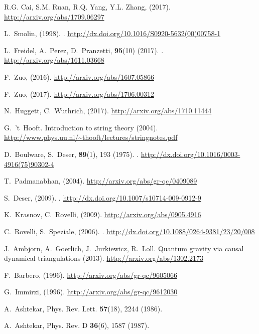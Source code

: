 \documentclass{ws-mpla}
\begin{document}
\begin{thebibliography}{0}
R.G. Cai, S.M. Ruan, R.Q. Yang, Y.L. Zhang,   (2017).
\newblock \urlprefix\url{http://arxiv.org/abs/1709.06297}

L.~Smolin,   (1998).
\newblock {}.
\newblock \urlprefix\url{http://dx.doi.org/10.1016/S0920-5632(00)00758-1}

L.~Freidel, A.~Perez, D.~Pranzetti,  \textbf{95}(10) (2017).
\newblock {}.
\newblock \urlprefix\url{http://arxiv.org/abs/1611.03668}

F.~Zuo,   (2016).
\newblock \urlprefix\url{http://arxiv.org/abs/1607.05866}

F.~Zuo,   (2017).
\newblock \urlprefix\url{http://arxiv.org/abs/1706.00312}

N.~Huggett, C.~Wuthrich,   (2017).
\newblock \urlprefix\url{http://arxiv.org/abs/1710.11444}

G.~'t~Hooft.
\newblock Introduction to string theory (2004).
\newblock
  \urlprefix\url{http://www.phys.uu.nl/~thooft/lectures/stringnotes.pdf}

D.~Boulware, S.~Deser,  \textbf{89}(1), 193 (1975).
\newblock {}.
\newblock \urlprefix\url{http://dx.doi.org/10.1016/0003-4916(75)90302-4}

T.~Padmanabhan,   (2004).
\newblock \urlprefix\url{http://arxiv.org/abs/gr-qc/0409089}

S.~Deser,   (2009).
\newblock {}.
\newblock \urlprefix\url{http://dx.doi.org/10.1007/s10714-009-0912-9}

K.~Krasnov, C.~Rovelli,   (2009).
\newblock \urlprefix\url{http://arxiv.org/abs/0905.4916}

C.~Rovelli, S.~Speziale,   (2006).
\newblock {}.
\newblock \urlprefix\url{http://dx.doi.org/10.1088/0264-9381/23/20/008}

J.~Ambjorn, A.~Goerlich, J.~Jurkiewicz, R.~Loll.
\newblock Quantum gravity via causal dynamical triangulations (2013).
\newblock \urlprefix\url{http://arxiv.org/abs/1302.2173}

F.~Barbero,   (1996).
\newblock \urlprefix\url{http://arxiv.org/abs/gr-qc/9605066}

G.~Immirzi,   (1996).
\newblock \urlprefix\url{http://arxiv.org/abs/gr-qc/9612030}

A.~Ashtekar, Phys. Rev. Lett. \textbf{57}(18), 2244 (1986).
\newblock {}

A.~Ashtekar, Phys. Rev. D \textbf{36}(6), 1587 (1987).
\newblock {}
\end{thebibliography}
\end{document}
